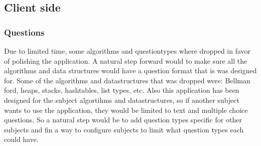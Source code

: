 \subsection{Client side}
\subsubsection{Questions}
Due to limited time, some algorithms and questiontypes where dropped in favor of polishing the application. A natural step forward would to make sure all the algorithms and data structures would have a question format that is was designed for. Some of the algorithms and datastructures that was dropped were: Bellman ford, heaps, stacks, hashtables, list types, etc. Also this application has been designed for the subject algortihms and datastructures, so if another subject wants to use the application, they would be limited to text and multiple choice questions. So a natural step would be to add question types specific for other subjects and fin a way to configure subjects to limit what question types each could have.